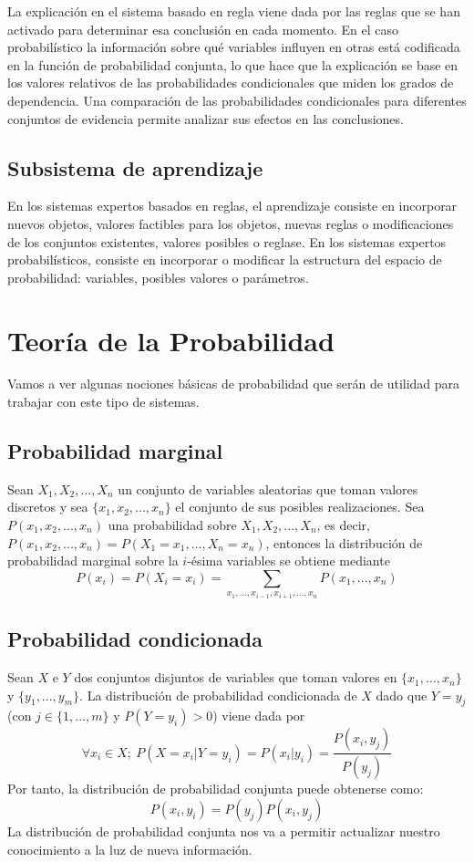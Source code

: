 \documentclass{article}
\begin{document}
La explicación en el sistema basado en regla viene dada por las reglas que se han activado para determinar esa conclusión en cada momento. En el caso probabilístico la información sobre qué variables influyen en otras está codificada en la función de probabilidad conjunta, lo que hace que la explicación se base en los valores relativos de las probabilidades condicionales que miden los grados de dependencia. Una comparación de las probabilidades condicionales para diferentes conjuntos de evidencia permite analizar sus efectos en las conclusiones.

\subsection{Subsistema de aprendizaje}

En los sistemas expertos basados en reglas, el aprendizaje consiste en incorporar nuevos objetos, valores factibles para los objetos, nuevas reglas o modificaciones de los conjuntos existentes, valores posibles o reglase. En los sistemas expertos probabilísticos, consiste en incorporar o modificar la estructura del espacio de probabilidad: variables, posibles valores o parámetros.

\section{Teoría de la Probabilidad}
Vamos a ver algunas nociones básicas de probabilidad que serán de utilidad para trabajar con este tipo de sistemas.
\subsection{Probabilidad marginal}
Sean $X_1,X_2,...,X_n$ un conjunto de variables aleatorias que toman valores discretos y sea $\{x_1,x_2,...,x_n\}$ el conjunto de sus posibles realizaciones. Sea $P(x_1,x_2,...,x_n)$ una probabilidad sobre $X_1,X_2,...,X_n$, es decir, $P(x_1,x_2,...,x_n) = P(X_1 = x_1,...,X_n=x_n)$, entonces la distribución de probabilidad marginal sobre la $i$-ésima variables se obtiene mediante
\[	P(x_i) = P(X_i=x_i) = \sum_{x_1,...,x_{i-1},x_{i+1},...,x_n}P(x_1,...,x_n)	\]

\subsection{Probabilidad condicionada}
Sean $X$ e $Y$ dos conjuntos disjuntos de variables que toman valores en $\{x_1,...,x_n\}$ y $\{y_1,...,y_m\}$. La distribución de probabilidad condicionada de $X$ dado que $Y=y_j$ (con $j \in \{1,...,m\}$ y $P(Y=y_i)>0$) viene dada por
\[	\forall x_i \in X;\ P(X=x_i|Y=y_i)=P(x_i|y_i)=\frac{P(x_i,y_j)}{P(y_j)}	\]
Por tanto, la distribución de probabilidad conjunta puede obtenerse como:
\[	P(x_i,y_i)=P(y_j)P(x_i,y_j)	\]
La distribución de probabilidad conjunta nos va a permitir actualizar nuestro conocimiento a la luz de nueva información.
\end{document}
